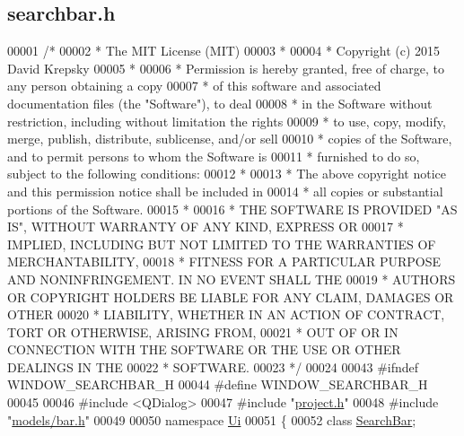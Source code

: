 \hypertarget{searchbar_8h_source}{}\subsection{searchbar.\+h}
\label{searchbar_8h_source}

\begin{DoxyCode}
00001 \textcolor{comment}{/*}
00002 \textcolor{comment}{ * The MIT License (MIT)}
00003 \textcolor{comment}{ *}
00004 \textcolor{comment}{ * Copyright (c) 2015 David Krepsky}
00005 \textcolor{comment}{ *}
00006 \textcolor{comment}{ * Permission is hereby granted, free of charge, to any person obtaining a copy}
00007 \textcolor{comment}{ * of this software and associated documentation files (the "Software"), to deal}
00008 \textcolor{comment}{ * in the Software without restriction, including without limitation the rights}
00009 \textcolor{comment}{ * to use, copy, modify, merge, publish, distribute, sublicense, and/or sell}
00010 \textcolor{comment}{ * copies of the Software, and to permit persons to whom the Software is}
00011 \textcolor{comment}{ * furnished to do so, subject to the following conditions:}
00012 \textcolor{comment}{ *}
00013 \textcolor{comment}{ * The above copyright notice and this permission notice shall be included in}
00014 \textcolor{comment}{ * all copies or substantial portions of the Software.}
00015 \textcolor{comment}{ *}
00016 \textcolor{comment}{ * THE SOFTWARE IS PROVIDED "AS IS", WITHOUT WARRANTY OF ANY KIND, EXPRESS OR}
00017 \textcolor{comment}{ * IMPLIED, INCLUDING BUT NOT LIMITED TO THE WARRANTIES OF MERCHANTABILITY,}
00018 \textcolor{comment}{ * FITNESS FOR A PARTICULAR PURPOSE AND NONINFRINGEMENT. IN NO EVENT SHALL THE}
00019 \textcolor{comment}{ * AUTHORS OR COPYRIGHT HOLDERS BE LIABLE FOR ANY CLAIM, DAMAGES OR OTHER}
00020 \textcolor{comment}{ * LIABILITY, WHETHER IN AN ACTION OF CONTRACT, TORT OR OTHERWISE, ARISING FROM,}
00021 \textcolor{comment}{ * OUT OF OR IN CONNECTION WITH THE SOFTWARE OR THE USE OR OTHER DEALINGS IN THE}
00022 \textcolor{comment}{ * SOFTWARE.}
00023 \textcolor{comment}{ */}
00024 
00043 \textcolor{preprocessor}{#ifndef WINDOW\_SEARCHBAR\_H}
00044 \textcolor{preprocessor}{#define WINDOW\_SEARCHBAR\_H}
00045 
00046 \textcolor{preprocessor}{#include <QDialog>}
00047 \textcolor{preprocessor}{#include "\hyperlink{project_8h}{project.h}"}
00048 \textcolor{preprocessor}{#include "\hyperlink{bar_8h}{models/bar.h}"}
00049 
00050 \textcolor{keyword}{namespace }\hyperlink{namespace_ui}{Ui}
00051 \{
00052 \textcolor{keyword}{class }\hyperlink{class_search_bar}{SearchBar};

\end{DoxyCode}
